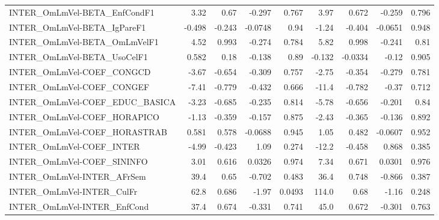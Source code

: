 \begin{tabular}{lrrrrrrrr}
INTER\_OmLmVel-BETA\_EnfCondF1          &        3.32 &         0.67 &  -0.297 &    0.767 &       3.97 &       0.672 &       -0.259 &         0.796 \\
INTER\_OmLmVel-BETA\_IgPareF1           &      -0.498 &       -0.243 & -0.0748 &     0.94 &      -1.24 &      -0.404 &      -0.0651 &         0.948 \\
INTER\_OmLmVel-BETA\_OmLmVelF1          &        4.52 &        0.993 &  -0.274 &    0.784 &       5.82 &       0.998 &       -0.241 &          0.81 \\
INTER\_OmLmVel-BETA\_UsoCelF1           &       0.582 &         0.18 &  -0.138 &     0.89 &     -0.132 &     -0.0334 &        -0.12 &         0.905 \\
INTER\_OmLmVel-COEF\_CONGCD             &       -3.67 &       -0.654 &  -0.309 &    0.757 &      -2.75 &      -0.354 &       -0.279 &         0.781 \\
INTER\_OmLmVel-COEF\_CONGEF             &       -7.41 &       -0.779 &  -0.432 &    0.666 &      -11.4 &      -0.782 &        -0.37 &         0.712 \\
INTER\_OmLmVel-COEF\_EDUC\_BASICA        &       -3.23 &       -0.685 &  -0.235 &    0.814 &      -5.78 &      -0.656 &       -0.201 &          0.84 \\
INTER\_OmLmVel-COEF\_HORAPICO           &       -1.13 &       -0.359 &  -0.157 &    0.875 &      -2.43 &      -0.365 &       -0.136 &         0.892 \\
INTER\_OmLmVel-COEF\_HORASTRAB          &       0.581 &        0.578 & -0.0688 &    0.945 &       1.05 &       0.482 &      -0.0607 &         0.952 \\
INTER\_OmLmVel-COEF\_INTER              &       -4.99 &       -0.423 &    1.09 &    0.274 &      -12.2 &      -0.458 &        0.868 &         0.385 \\
INTER\_OmLmVel-COEF\_SININFO            &        3.01 &        0.616 &  0.0326 &    0.974 &       7.34 &       0.671 &       0.0301 &         0.976 \\
INTER\_OmLmVel-INTER\_AFrSem            &        39.4 &         0.65 &  -0.702 &    0.483 &       36.4 &       0.748 &       -0.866 &         0.387 \\
INTER\_OmLmVel-INTER\_CulFr             &        62.8 &        0.686 &   -1.97 &   0.0493 &      114.0 &        0.68 &        -1.16 &         0.248 \\
INTER\_OmLmVel-INTER\_EnfCond           &        37.4 &        0.674 &  -0.331 &    0.741 &       45.0 &       0.672 &       -0.301 &         0.763 \\

\end{tabular}
